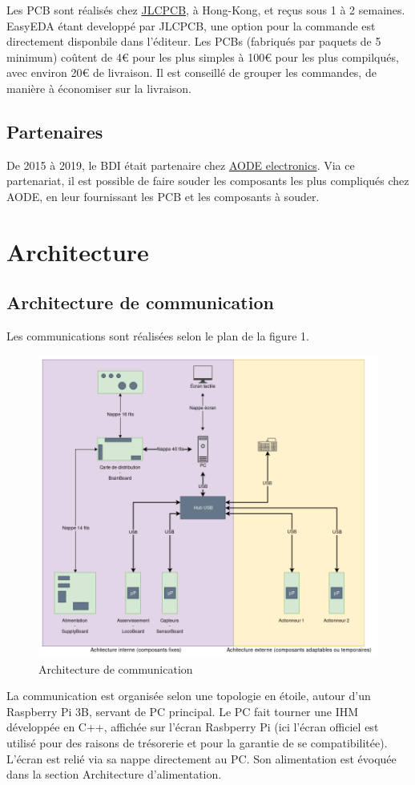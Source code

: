 \documentclass[a4paper,10pt]{refart}
\begin{document}
	Les PCB sont réalisés chez \href{https://jlcpcb.com/}{JLCPCB}, à 
	Hong-Kong, et reçus sous 1 à 2 semaines. EasyEDA étant developpé par 
	JLCPCB, une option pour la commande est directement disponbile dans 
	l'éditeur. Les PCBs (fabriqués par paquets de 5 minimum) coûtent de 4€ pour 
	les plus simples à 100€ pour les plus compilqués, avec environ 20€ de 
	livraison. Il est conseillé de grouper les commandes, de manière à 
	économiser sur la livraison.

\subsection{Partenaires}
	De 2015 à 2019, le BDI était partenaire chez 
	\href{http://www.aode-electronics.com/}{AODE electronics}. Via ce 
	partenariat, il est possible de faire souder les composants les plus
	compliqués chez AODE, en leur fournissant les PCB et les composants à 
	souder.

\section{Architecture}

\subsection{Architecture de communication}
	Les communications sont réalisées selon le plan de la figure 1.
	\begin{figure}[h]
		\caption{Architecture de communication}
		\centering
		\includegraphics[width=1\textwidth]{pictures/arch_data}
	\end{figure}
	La communication est organisée selon une topologie en étoile, autour d'un
	Raspberry Pi 3B, servant de PC principal. Le PC fait tourner une IHM
	développée en C++, affichée sur l'écran Rasbperry Pi (ici l'écran officiel
	est utilisé pour des raisons de trésorerie et pour la garantie de se
	compatibilitée). L'écran est relié via sa nappe directement au PC. Son 
	alimentation est évoquée dans la section Architecture d'alimentation.
\end{document}
